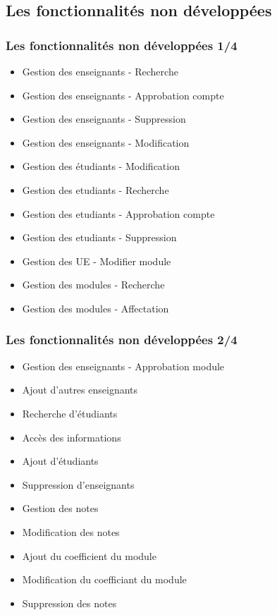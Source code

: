 \documentclass{beamer}
\begin{document}
    \subsection{Les fonctionnalités non développées}
      \begin{frame}
        \frametitle{Les fonctionnalités non développées 1/4}
        \begin{block}{}
          \begin{itemize}
            \item Gestion des enseignants - Recherche
            \item Gestion des enseignants - Approbation compte
            \item Gestion des enseignants - Suppression
            \item Gestion des enseignants - Modification
            \item Gestion des étudiants - Modification
            \item Gestion des etudiants - Recherche
            \item Gestion des etudiants - Approbation compte
            \item Gestion des etudiants - Suppression
            \item Gestion des UE - Modifier module
            \item Gestion des modules - Recherche
            \item Gestion des modules - Affectation
          \end{itemize}
        \end{block}
      \end{frame}
      \begin{frame}
        \frametitle{Les fonctionnalités non développées 2/4}
        \begin{block}{}
          \begin{itemize}
            \item Gestion des enseignants - Approbation module
            \item Ajout d'autres enseignants
            \item Recherche d'étudiants
            \item Accès des informations
            \item Ajout d'étudiants
            \item Suppression d'enseignants
            \item Gestion des notes
            \item Modification des notes
            \item Ajout du coefficient du module
            \item Modification du coefficiant du module
            \item Suppression des notes
          \end{itemize}
        \end{block}
      \end{frame}
\end{document}
